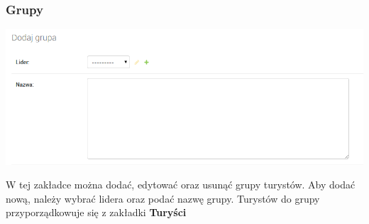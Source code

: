 \documentclass[a4paper,12pt]{article}
\begin{document}
\subsubsection{Grupy}
\begin{center}
\includegraphics[scale=1]{ui7.png}
\end{center}
W tej zakładce można dodać, edytować oraz usunąć grupy turystów. Aby dodać nową, należy wybrać lidera oraz podać nazwę grupy. Turystów do grupy przyporządkowuje się z zakładki \textbf{Turyści}
\end{document}
